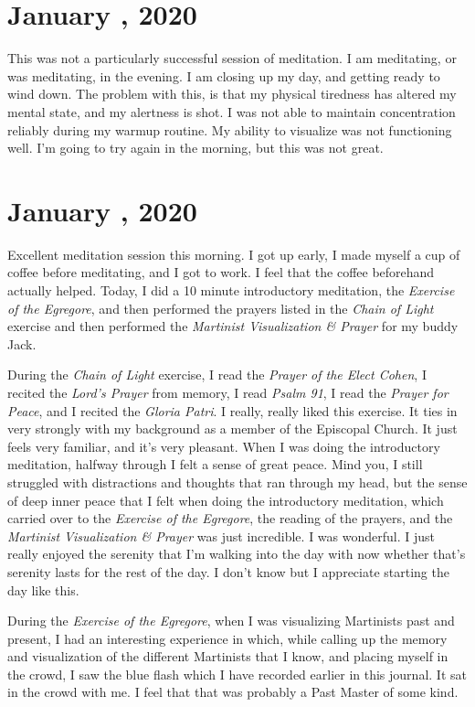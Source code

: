 \documentclass[b6paper]{article}
\newcommand*{\newentry}[3]{\pagebreak{}\section*{#1 \nth{#2}, #3}}
\newcommand{\mvp}{\textit{Martinist Visualization \& Prayer}}
\newcommand{ \eoe}{\textit{Exercise of the Egregore}}
\newcommand{\col}{\textit{Chain of Light} exercise}
\begin{document}
\newentry{January}{12}{2020}

This was not a particularly successful session of meditation. I am meditating, or was meditating, in the evening. I am closing up my day, and getting ready to wind down. The problem with this, is that my physical tiredness has altered my mental state, and my alertness is shot. I was not able to maintain concentration reliably during my warmup routine. My ability to visualize was not functioning well. I'm going to try again in the morning, but this was not great.

\newentry{January}{13}{2020}

Excellent meditation session this morning. I got up early, I made myself a cup of coffee before meditating, and I got to work. I feel that the coffee beforehand actually helped. Today, I did a 10 minute introductory meditation, the \eoe{}, and then performed the prayers listed in the \col{} and then performed the \mvp{} for my buddy Jack.

During the \col{}, I read the \textit{Prayer of the Elect Cohen}, I recited the \textit{Lord's Prayer} from memory, I read \textit{Psalm 91}, I read the \textit{Prayer for Peace}, and I recited the \textit{Gloria Patri}. I really, really liked this exercise. It ties in very strongly with my background as a member of the Episcopal Church. It just feels very familiar, and it's very pleasant. When I was doing the introductory meditation, halfway through I felt a sense of great peace. Mind you, I still struggled with distractions and thoughts that ran through my head, but the sense of deep inner peace that I felt when doing the introductory meditation, which carried over to the \eoe{}, the reading of the prayers, and the \mvp{} was just incredible. I was wonderful. I just really enjoyed the serenity that I'm walking into the day with now whether that's serenity lasts for the rest of the day. I don't know but I appreciate starting the day like this.

During the \eoe{}, when I was visualizing Martinists past and present, I had an interesting experience in which, while calling up the memory and visualization of the different Martinists that I know, and placing myself in the crowd, I saw the blue flash which I have recorded earlier in this journal. It sat in the crowd with me. I feel that that was probably a Past Master of some kind.
\end{document}
